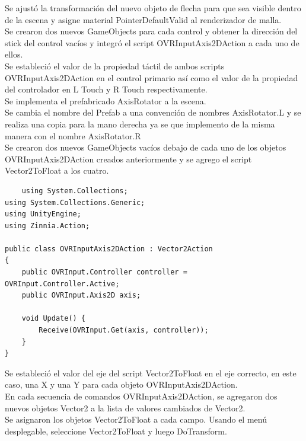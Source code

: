 Se ajustó la transformación del nuevo objeto de flecha para que sea visible dentro de la escena y asigne material PointerDefaultValid al renderizador de malla.\\

Se crearon dos nuevos GameObjects para cada control y obtener la dirección del stick del control vacíos y integró el script OVRInputAxis2DAction a cada uno de ellos.\\

Se estableció el valor de la propiedad táctil de ambos scripts OVRInputAxis2DAction en el control primario así como el valor de la propiedad del controlador en L Touch y R Touch respectivamente.\\

Se implementa el prefabricado AxisRotator a la escena.\\

Se cambia el nombre del Prefab a una convención de nombres AxisRotator.L  y se realiza una copia para la mano derecha ya se que implemento de la misma manera con el nombre AxisRotator.R\\

Se crearon dos nuevos GameObjects vacíos debajo de cada uno de los objetos OVRInputAxis2DAction creados anteriormente y se agrego el script Vector2ToFloat a los cuatro.\\

\begin{verbatim}
    using System.Collections;
using System.Collections.Generic;
using UnityEngine;
using Zinnia.Action;
 
public class OVRInputAxis2DAction : Vector2Action
{
    public OVRInput.Controller controller = OVRInput.Controller.Active;
    public OVRInput.Axis2D axis;
 
    void Update() {
        Receive(OVRInput.Get(axis, controller));
    }
}
\end{verbatim}

Se estableció el valor del eje del script Vector2ToFloat en el eje correcto, en este caso, una X y una Y para cada objeto OVRInputAxis2DAction.\\
En cada secuencia de comandos OVRInputAxis2DAction, se agregaron dos nuevos objetos Vector2 a la lista de valores cambiados de Vector2.\\

Se asignaron los objetos Vector2ToFloat a cada campo. Usando el menú desplegable, seleccione Vector2ToFloat y luego DoTransform.\\

